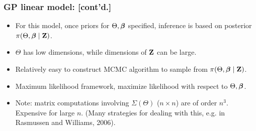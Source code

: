 \documentclass{beamer}
\begin{document}
\begin{frame}
\frametitle{GP linear model:  [cont'd.] }
\begin{itemize}
\item For this model, once priors for $\Theta,\mbox{\boldmath $\beta$}$ specified, inference is based on posterior $\pi(\Theta,\mbox{\boldmath $\beta$}\mid {\bf Z})$. 
\item $\Theta$ has low dimensions, while dimensions of ${\bf Z}$
  can be large.
\item Relatively easy to construct MCMC algorithm to sample from
  $\pi(\Theta,\mbox{\boldmath $\beta$}\mid {\bf Z})$. 
\item Maximum likelihood framework, maximize likelihood with respect to $\Theta, \mbox{\boldmath $\beta$}$.
\item Note: matrix computations involving $\Sigma(\Theta)$ ($n\times n$)
  are of order $n^3$. Expensive for large $n$. (Many strategies for dealing with this, e.g. in Rasmussen and Williams, 2006).
\end{itemize}
\end{frame}
\end{document}
